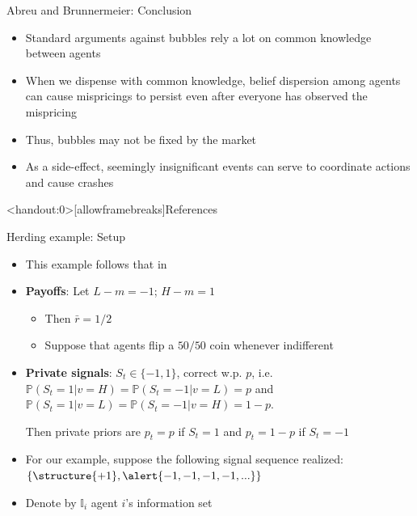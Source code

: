 \documentclass[english,10pt
,aspectratio=169
]{beamer}
\begin{document}
\begin{frame}{Abreu and Brunnermeier: Conclusion}
	\begin{itemize}
		\item Standard arguments against bubbles rely a lot on common knowledge between agents
		\item When we dispense with common knowledge, belief dispersion among agents can cause mispricings to persist even after everyone has observed the mispricing
		\item Thus, bubbles may not be fixed by the market
		\item As a side-effect, seemingly insignificant events can serve to coordinate actions and cause crashes
	\end{itemize}
\end{frame}






\appendix
\begin{frame}<handout:0>[allowframebreaks]{References}
	
	
\end{frame}


\begin{frame}{Herding example: Setup} \label{EXP}
	\begin{itemize}
		\item This example follows that in \cite{bikhchandani_herd_2000}
		\item \textbf{Payoffs}: Let $L-m = -1$; $H-m = 1$
		\begin{itemize}
			\item Then $\bar{r} = 1/2$
			\item Suppose that agents flip a $50/50$ coin whenever indifferent
		\end{itemize}
		\item \textbf{Private signals}: $S_t \in \{-1,1\}$, correct w.p. $p$, i.e. $\mathbb{P}(S_t=1|v=H) = \mathbb{P}(S_t=-1|v=L) = p$ and $\mathbb{P}(S_t=1|v=L) = \mathbb{P}(S_t=-1|v=H) = 1-p$.
		
		Then private priors are $p_t = p$ if $S_t = 1$ and $p_t = 1-p$ if $S_t = -1$
		\item For our example, suppose the following signal sequence realized: $\{\structure{+1},\alert{ -1, -1, -1, -1, ...}\}$
		\item Denote by $\mathbb{I}_i$ agent $i$'s information set
	\end{itemize}
\end{frame}
\end{document}
